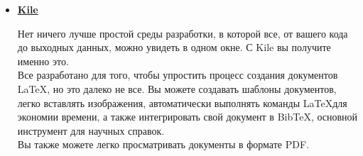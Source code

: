 \documentclass[a4paper,12pt]{article} %
\begin{document}
\begin{itemize}
\item \large \textbf{\href{https://kile.sourceforge.io/}{Kile}}

\normalsize Нет ничего лучше простой среды разработки, в которой все, от вашего кода до выходных данных, можно увидеть в одном окне. С Kile вы получите именно это.\\
Все разработано для того, чтобы упростить процесс создания документов \LaTeX, но это далеко не все. Вы можете создавать шаблоны документов, легко вставлять изображения, автоматически выполнять команды \LaTeX для экономии времени, а также интегрировать свой документ в BibTeX, основной инструмент для научных справок.\\
Вы также можете легко просматривать документы в формате PDF.\\

\end{itemize}
\end{document}
